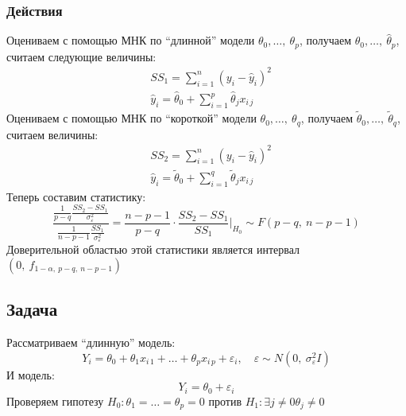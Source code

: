 \documentclass[12pt, a4paper]{article}
\begin{document}
\subsubsection*{Действия}
Оцениваем с помощью МНК по ``длинной'' модели $\theta_0,\dots,\ \theta_p$, получаем $\hat \theta_0,\dots,\ \hat\theta_p$, считаем следующие величины:
\[
\begin{aligned}
    & SS_1 = \sum_{i = 1}^{n} {\left( y_i - \hat y_i \right)}^2\\
    & \hat y_i = \hat \theta_0 + \sum_{i = 1}^{p} \hat \theta_j x_{i\, j}
\end{aligned}
\]
Оцениваем с помощью МНК по ``короткой'' модели $\theta_0,\dots,\ \theta_q$, получаем $\tilde \theta_0,\dots,\ \tilde\theta_q$, считаем величины:
\[
    \begin{aligned}
    & SS_2 = \sum_{i = 1}^{n} {\left( y_i - \hat y_i \right)}^2\\
    & \hat y_i = \tilde \theta_0 + \sum_{i = 1}^{q} \tilde \theta_j x_{i\, j}
\end{aligned}
\]
Теперь составим статистику:
\[
\frac{ \frac{1}{p - q} \frac{SS_2 - SS_1}{  \sigma_{\varepsilon}^2}}{ \frac{1}{n - p - 1} \frac{SS_1}{\sigma_{\varepsilon}^2} } = \frac{n - p - 1}{p - q} \cdot \frac{SS_2 - SS_1}{SS_1} \Bigg|_{H_0} \sim F(p - q,\ n - p - 1)
\]
Доверительной областью этой статистики является интервал $(0,\ f_{1 - \alpha,\ p - q,\ n - p - 1})$

\subsection*{Задача}
Рассматриваем ``длинную'' модель:
\[
Y_i = \theta_0 + \theta_1 x_{i\, 1} + \dots + \theta_p x_{i\, p} + \varepsilon_i,\quad \varepsilon \sim N(0,\ \sigma_{\varepsilon}^2 I)
\]
И модель:
\[
Y_i = \theta_0 + \varepsilon_i
\]
Проверяем гипотезу $H_0: \theta_{1} = \dots = \theta_p = 0$ против $H_1: \exists j \neq 0 \theta_j \neq 0$
\end{document}

